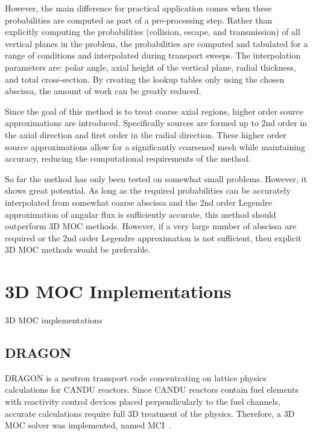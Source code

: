 However, the main difference for practical application comes when these probabilities are computed as part of a pre-processing step. Rather than explicitly computing the probabilities (collision, escape, and transmission) of all vertical planes in the problem, the probabilities are computed and tabulated for a range of conditions and interpolated during transport sweeps. The interpolation parameters are: polar angle, axial height of the vertical plane, radial thickness, and total cross-section. By creating the lookup tables only using the chosen abscissa, the amount of work can be greatly reduced.

Since the goal of this method is to treat coarse axial regions, higher order source approximations are introduced. Specifically sources are formed up to 2nd order in the axial direction and first order in the radial direction. These higher order source approximations allow for a significantly coarsened mesh while maintaining accuracy, reducing the computational requirements of the method.

So far the method has only been tested on somewhat small problems. However, it shows great potential. As long as the required probabilities can be accurately interpolated from somewhat coarse abscissa and the 2nd order Legendre approximation of angular flux is sufficiently accurate, this method should outperform 3D \ac{MOC} methods. However, if a very large number of abscissa are required or the 2nd order Legendre approximation is not sufficient, then explicit 3D \ac{MOC} methods would be preferable. 

\section{3D MOC Implementations}
\label{sec:3d-imp}

3D MOC implementations

\subsection{DRAGON}
\label{sec:dragon}
DRAGON is a neutron transport code concentrating on lattice physics calculations for CANDU reactors. Since CANDU reactors contain fuel elements with reactivity control devices placed perpendicularly to the fuel channels, accurate calculations require full 3D treatment of the physics. Therefore, a 3D \ac{MOC} solver was implemented, named MCI~\cite{dragon_3d_moc}. 

